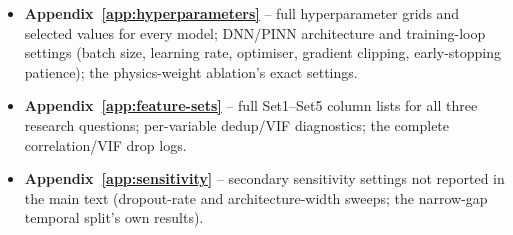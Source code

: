 \begin{itemize}
\setlength\itemsep{0pt}
\item \textbf{Appendix~\ref{app:hyperparameters}} -- full hyperparameter grids and selected
  values for every model; DNN/PINN architecture and training-loop settings (batch size, learning
  rate, optimiser, gradient clipping, early-stopping patience); the physics-weight ablation's
  exact settings.
\item \textbf{Appendix~\ref{app:feature-sets}} -- full Set1--Set5 column lists for all three
  research questions; per-variable dedup/VIF diagnostics; the complete correlation/VIF drop logs.
\item \textbf{Appendix~\ref{app:sensitivity}} -- secondary sensitivity settings not reported in
  the main text (dropout-rate and architecture-width sweeps; the narrow-gap temporal split's own
  results).
\end{itemize}

